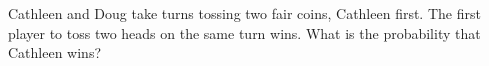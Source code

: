 Cathleen and Doug take turns tossing two fair coins, Cathleen first. The first player to toss two heads on the same turn wins. What is the probability that Cathleen wins?
